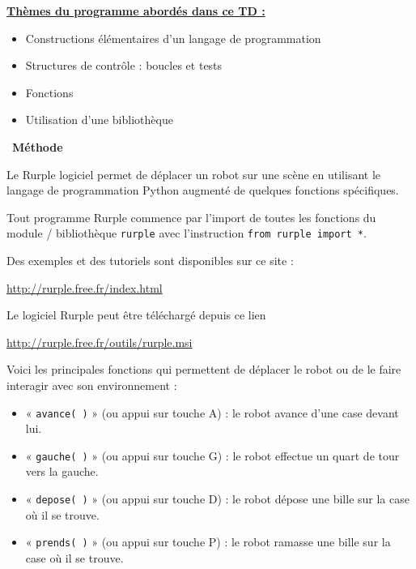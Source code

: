 \documentclass[a4paper, french, 12pt]{article}  %
\newcounter{prog}
\newcounter{logi}
\newenvironment{methode}[1]
{\par \medskip    \noindent  
 \begin {bclogo}[arrondi =0.1,logo=\bcoutil, marge=4,noborder = true] {~\textbf{Méthode}   {\itshape #1} }  \par}
{
\end{bclogo}
 \par \bigskip }
\begin{document}
{\bfseries \underline{Thèmes du programme abordés dans ce TD :} }

\begin{itemize}
	\item Constructions élémentaires d'un langage de programmation
	\item Structures de contrôle : boucles et tests
	\item Fonctions 
	\item Utilisation d'une bibliothèque

\end{itemize}



\begin{methode}{}
Le Rurple logiciel permet de déplacer un robot  sur une scène en utilisant le langage de programmation Python augmenté de quelques fonctions spécifiques.

Tout programme Rurple commence par l'import de toutes les fonctions du module / bibliothèque \texttt{rurple} avec l'instruction \texttt{from rurple import *}.

Des exemples et des tutoriels sont disponibles sur ce site :

\begin{center}
\url{http://rurple.free.fr/index.html}
\end{center} 

Le logiciel Rurple peut être téléchargé depuis ce lien 

\begin{center}
\url{http://rurple.free.fr/outils/rurple.msi}
\end{center} 


Voici les principales fonctions qui permettent de déplacer le robot ou de le faire interagir avec son environnement :
\begin{itemize}[label=]
 \item « \texttt{avance( )} »  (ou appui sur touche A) : le robot avance d'une case devant lui.
 \item « \texttt{gauche( )} »  (ou appui sur touche G) : le robot effectue un quart de tour vers la gauche.
 \item « \texttt{depose( )} » (ou appui sur touche D) : le robot dépose une bille sur la case où il se trouve.
 \item « \texttt{prends( )} » (ou appui sur touche P) : le robot ramasse une bille sur la case où il se trouve.
\end{itemize}


\end{methode}
\end{document}
